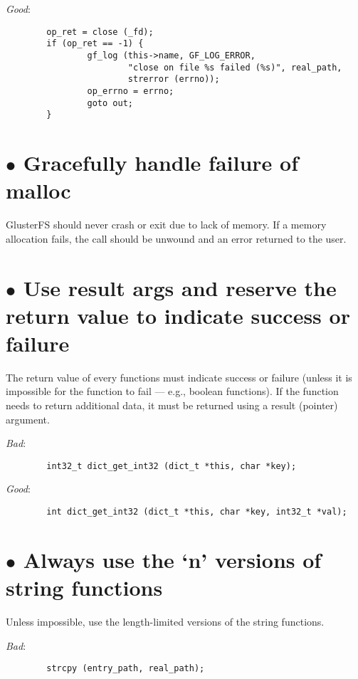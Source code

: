 \documentclass{article}[12pt]
\begin{document}
\textsl{Good}:

\begin{verbatim}
        op_ret = close (_fd);
        if (op_ret == -1) {
                gf_log (this->name, GF_LOG_ERROR, 
                        "close on file %s failed (%s)", real_path, 
                        strerror (errno));
                op_errno = errno;
                goto out;
        }
\end{verbatim}


\section*{$\bullet$ Gracefully handle failure of malloc}
GlusterFS should never crash or exit due to lack of memory. If a
memory allocation fails, the call should be unwound and an error
returned to the user.

\section*{$\bullet$ Use result args and reserve the return value to indicate success or failure}
The return value of every functions must indicate success or failure (unless 
it is impossible for the function to fail --- e.g., boolean functions). If 
the function needs to return additional data, it must be returned using a 
result (pointer) argument.

\vspace{2ex}
\textsl{Bad}:

\begin{verbatim}
        int32_t dict_get_int32 (dict_t *this, char *key);
\end{verbatim}

\textsl{Good}:

\begin{verbatim}
        int dict_get_int32 (dict_t *this, char *key, int32_t *val);
\end{verbatim}

\section*{$\bullet$ Always use the `n' versions of string functions}
Unless impossible, use the length-limited versions of the string functions.

\vspace{2ex}
\textsl{Bad}:

\begin{verbatim}
        strcpy (entry_path, real_path);
\end{verbatim}
\end{document}
